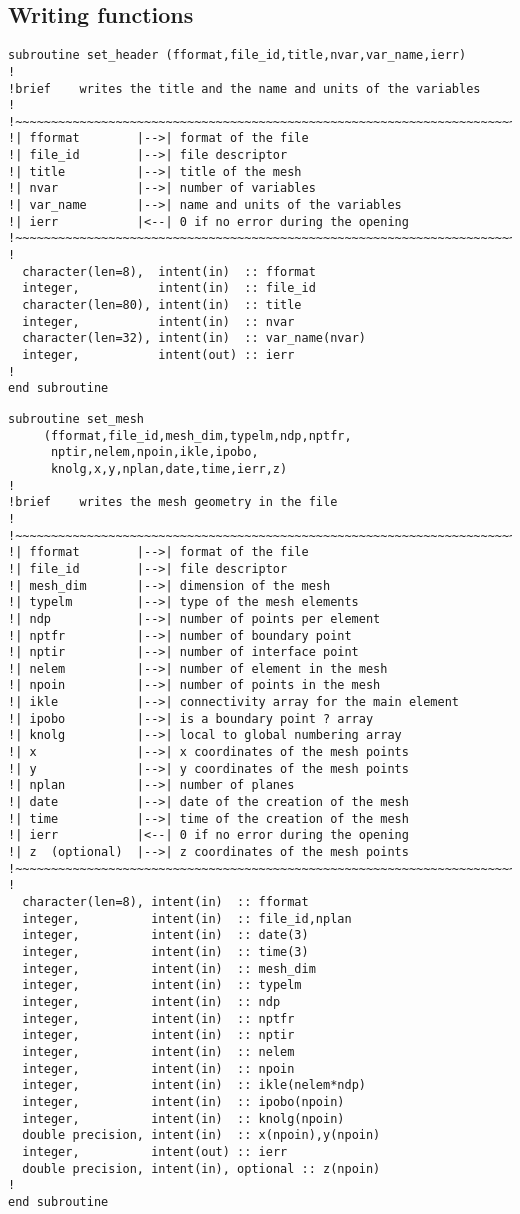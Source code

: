 \subsection{Writing functions}
%
\begin{lstlisting}
subroutine set_header (fformat,file_id,title,nvar,var_name,ierr)
!
!brief    writes the title and the name and units of the variables
!
!~~~~~~~~~~~~~~~~~~~~~~~~~~~~~~~~~~~~~~~~~~~~~~~~~~~~~~~~~~~~~~~~~~~~~~~
!| fformat        |-->| format of the file
!| file_id        |-->| file descriptor
!| title          |-->| title of the mesh
!| nvar           |-->| number of variables
!| var_name       |-->| name and units of the variables
!| ierr           |<--| 0 if no error during the opening
!~~~~~~~~~~~~~~~~~~~~~~~~~~~~~~~~~~~~~~~~~~~~~~~~~~~~~~~~~~~~~~~~~~~~~~~
!
  character(len=8),  intent(in)  :: fformat
  integer,           intent(in)  :: file_id
  character(len=80), intent(in)  :: title
  integer,           intent(in)  :: nvar
  character(len=32), intent(in)  :: var_name(nvar)
  integer,           intent(out) :: ierr
!
end subroutine
\end{lstlisting}
%
\begin{lstlisting}
subroutine set_mesh
     (fformat,file_id,mesh_dim,typelm,ndp,nptfr,
      nptir,nelem,npoin,ikle,ipobo,
      knolg,x,y,nplan,date,time,ierr,z)
!
!brief    writes the mesh geometry in the file
!
!~~~~~~~~~~~~~~~~~~~~~~~~~~~~~~~~~~~~~~~~~~~~~~~~~~~~~~~~~~~~~~~~~~~~~~~
!| fformat        |-->| format of the file
!| file_id        |-->| file descriptor
!| mesh_dim       |-->| dimension of the mesh
!| typelm         |-->| type of the mesh elements
!| ndp            |-->| number of points per element
!| nptfr          |-->| number of boundary point
!| nptir          |-->| number of interface point
!| nelem          |-->| number of element in the mesh
!| npoin          |-->| number of points in the mesh
!| ikle           |-->| connectivity array for the main element
!| ipobo          |-->| is a boundary point ? array
!| knolg          |-->| local to global numbering array
!| x              |-->| x coordinates of the mesh points
!| y              |-->| y coordinates of the mesh points
!| nplan          |-->| number of planes
!| date           |-->| date of the creation of the mesh
!| time           |-->| time of the creation of the mesh
!| ierr           |<--| 0 if no error during the opening
!| z  (optional)  |-->| z coordinates of the mesh points
!~~~~~~~~~~~~~~~~~~~~~~~~~~~~~~~~~~~~~~~~~~~~~~~~~~~~~~~~~~~~~~~~~~~~~~~
!
  character(len=8), intent(in)  :: fformat
  integer,          intent(in)  :: file_id,nplan
  integer,          intent(in)  :: date(3)
  integer,          intent(in)  :: time(3)
  integer,          intent(in)  :: mesh_dim
  integer,          intent(in)  :: typelm
  integer,          intent(in)  :: ndp
  integer,          intent(in)  :: nptfr
  integer,          intent(in)  :: nptir
  integer,          intent(in)  :: nelem
  integer,          intent(in)  :: npoin
  integer,          intent(in)  :: ikle(nelem*ndp)
  integer,          intent(in)  :: ipobo(npoin)
  integer,          intent(in)  :: knolg(npoin)
  double precision, intent(in)  :: x(npoin),y(npoin)
  integer,          intent(out) :: ierr
  double precision, intent(in), optional :: z(npoin)
!
end subroutine
\end{lstlisting}
